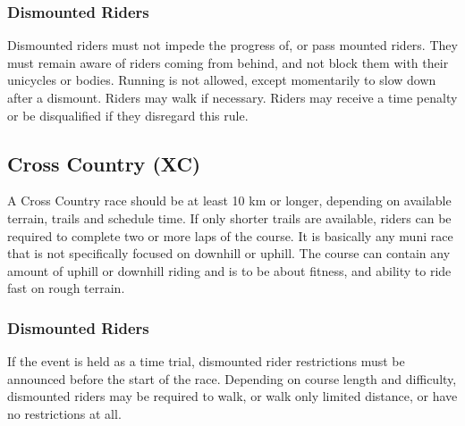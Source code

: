\subsubsection{Dismounted Riders}
Dismounted riders must not impede the progress of, or pass mounted riders. They
must remain aware of riders coming from behind, and not block them with their
unicycles or bodies. Running is not allowed, except momentarily to slow down
after a dismount. Riders may walk if necessary. Riders may receive a time
penalty or be disqualified if they disregard this rule.

\subsection{Cross Country (XC)}
A Cross Country race should be at least 10 km or longer, depending on available
terrain, trails and schedule time. If only shorter trails are available, riders
can be required to complete two or more laps of the course. It is basically any
muni race that is not specifically focused on downhill or uphill. The course can
contain any amount of uphill or downhill riding and is to be about fitness, and
ability to ride fast on rough terrain.

\subsubsection{Dismounted Riders}
If the event is held as a time trial, dismounted rider restrictions must be
announced before the start of the race. Depending on course length and
difficulty, dismounted riders may be required to walk, or walk only limited
distance, or have no restrictions at all.

